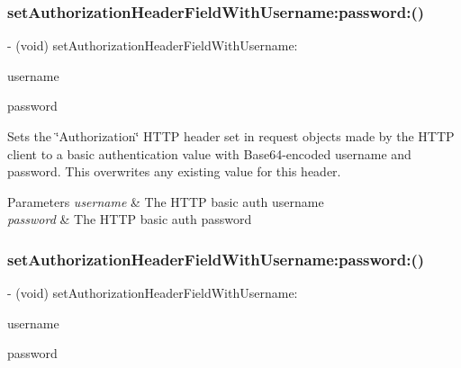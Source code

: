 \subsubsection{\texorpdfstring{set\+Authorization\+Header\+Field\+With\+Username\+:password\+:()}{setAuthorizationHeaderFieldWithUsername:password:()}\hspace{0.1cm}{\footnotesize\ttfamily [1/3]}}
{\footnotesize\ttfamily -\/ (void) set\+Authorization\+Header\+Field\+With\+Username\+: \begin{DoxyParamCaption}\item[{(N\+S\+String $\ast$)}]{username }\item[{password:(N\+S\+String $\ast$)}]{password }\end{DoxyParamCaption}}

Sets the \char`\"{}\+Authorization\char`\"{} H\+T\+TP header set in request objects made by the H\+T\+TP client to a basic authentication value with Base64-\/encoded username and password. This overwrites any existing value for this header.


\begin{DoxyParams}{Parameters}
{\em username} & The H\+T\+TP basic auth username \\
\hline
{\em password} & The H\+T\+TP basic auth password \\
\hline
\end{DoxyParams}
\mbox{\label{interface_a_f_h_t_t_p_request_serializer_a67c09b048eff53d3e9cad39a954d5676}} 
\subsubsection{\texorpdfstring{set\+Authorization\+Header\+Field\+With\+Username\+:password\+:()}{setAuthorizationHeaderFieldWithUsername:password:()}\hspace{0.1cm}{\footnotesize\ttfamily [2/3]}}
{\footnotesize\ttfamily -\/ (void) set\+Authorization\+Header\+Field\+With\+Username\+: \begin{DoxyParamCaption}\item[{(N\+S\+String $\ast$)}]{username }\item[{password:(N\+S\+String $\ast$)}]{password }\end{DoxyParamCaption}}

